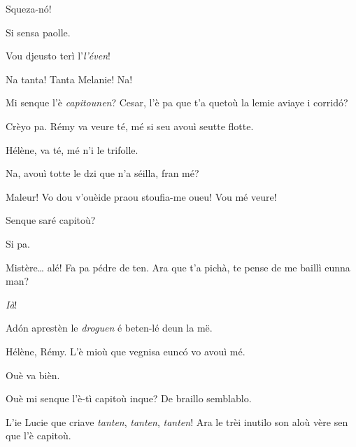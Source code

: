 \begin{drama}
\Hermannspeaks{} Squeza-n\'o!

\Cesarspeaks Si sensa paolle.

\Peterspeaks{} Vou djeusto terì l’\textit{l'éven}!


\Luciespeaks{} Na tanta! Tanta Melanie! Na!

\Hermannspeaks Mi senque l'è \textit{capitounen}? Cesar, l'è pa que t'a quetoù la lemie aviaye i corrid\'o?

\Cesarspeaks Crèyo pa. Rémy va veure té, mé si seu avouì seutte flotte.

\Remyspeaks Hélène, va té, mé n'i le trifolle.

\Helenespeaks Na, avouì totte le dzi que n'a séilla, fran mé?

\Cesarspeaks{} Maleur! Vo dou v'ouèide praou stoufia-me oueu! Vou mé veure!


\Hermannspeaks{} Senque saré capitoù?

\Peterspeaks Si pa.

\Hermannspeaks Mistère\ldots {} alé! Fa pa pédre de ten. Ara que t'a pichà, te pense de me baillì eunna man?

\Peterspeaks \textit{Ià}!

\Hermannspeaks Ad\'on aprestèn le \textit{droguen} é beten-lé deun la më.



\Cesarspeaks{} Hélène, Rémy. L'è mioù que vegnisa eunc\'o vo avouì mé.

\Remyspeaks Ouè va bièn.




\Germenespeaks Ouè mi senque l’è-tì capitoù inque? De braillo semblablo. 

\Hermannspeaks L'ie Lucie que criave \textit{tanten}, \textit{tanten}, \textit{tanten}! Ara le trèi inutilo son aloù vère sen que l'è capitoù.


\end{drama}

